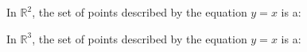 \documentclass{ximera}
\author{Jim Talamo and Bart Snapp}
\begin{document}
\begin{exercise}
  In $\mathbb{R}^2$, the set of points described by the equation
  $y=x$ is a:
  \begin{multipleChoice}
  \end{multipleChoice}
  \begin{exercise}
  In $\mathbb{R}^3$, the set of points described by the equation $y=x$ is a:
  \begin{multipleChoice}
  \end{multipleChoice}
\end{exercise}
\end{exercise}
\end{document}

